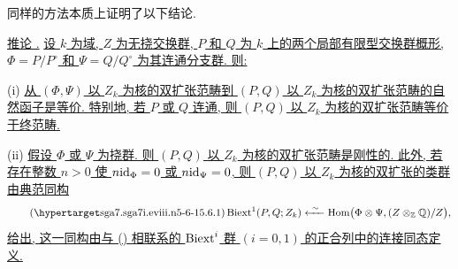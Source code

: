同样的方法本质上证明了以下结论.

\medskip
\noindent\underline{推论 .} \underline{设 $k$ 为域, $Z$ 为无挠交换群, $P$ 和 $Q$ 为 $k$ 上的两个局部有限型交换群概形, $\Phi=P/P^\circ$ 和 $\Psi=Q/Q^\circ$ 为其连通分支群. 则:}

\smallskip
\noindent (i) \underline{从 $(\Phi,\Psi)$ 以 $Z_k$ 为核的双扩张范畴到 $(P,Q)$ 以 $Z_k$ 为核的双扩张范畴的自然函子是等价. 特别地, 若 $P$ 或 $Q$ 连通, 则 $(P,Q)$ 以 $Z_k$ 为核的双扩张范畴等价于终范畴.}

\smallskip
\noindent (ii) \underline{假设 $\Phi$ 或 $\Psi$ 为挠群. 则 $(P,Q)$ 以 $Z_k$ 为核的双扩张范畴是刚性的. 此外, 若存在整数 $n>0$ 使 $n\mathrm{id}_\Phi=0$ 或 $n\mathrm{id}_\Psi=0$, 则 $(P,Q)$ 以 $Z_k$ 为核的双扩张的类群由典范同构}
\begin{equation}\tag{\SGARefTarget{sga7.sga7i.eviii.n5-6-1}{5.6.1}}
 \Biext^1(P,Q;Z_k)
 \xleftarrow{\ \sim\ }
 \Hom\bigl(\Phi\otimes\Psi,(Z\otimes_{\mathbb Z}\mathbb Q)/Z\bigr),
\end{equation}
\underline{给出, 这一同构由与 () 相联系的 $\operatorname{Biext}^i$ 群 $(i=0,1)$ 的正合列中的连接同态定义.}




